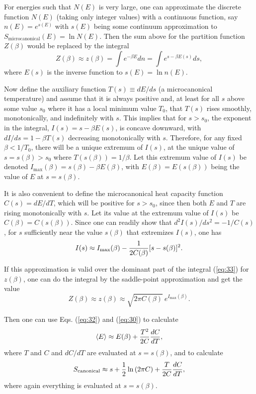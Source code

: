 \documentclass[12pt]{article} \usepackage{latexsym} \textwidth 15cm
\begin{document}
For energies such that $N(E)$ is very large, one can approximate the
discrete function $N(E)$ (taking only integer values) with a continuous
function, say $n(E) = e^{s(E)}$ with $s(E)$ being some continuum
approximation to $S_{\mathrm{microcanonical}}(E) = \ln{N(E)}$.  Then
the sum above for the partition function $Z(\beta)$ would be replaced
by the integral
 \begin{equation}
 Z(\beta) \approx z(\beta) = \int e^{-\beta E} dn
  = \int e^{s-\beta E(s)} ds,
 \label{eq:33}
 \end{equation}
where $E(s)$ is the inverse function to $s(E) = \ln{n(E)}$.

Now define the auxiliary function $T(s) \equiv dE/ds$ (a microcanonical
temperature) and assume that it is always positive and, at least for
all $s$ above some value $s_0$ where it has a local minimum value
$T_0$, that $T(s)$ rises smoothly, monotonically, and indefinitely with
$s$.  This implies that for $s > s_0$, the exponent in the integral,
$I(s) = s-\beta E(s)$, is concave downward, with $dI/ds = 1 - \beta
T(s)$ decreasing monotonically with $s$.  Therefore, for any fixed
$\beta < 1/T_0$, there will be a unique extremum of $I(s)$, at the
unique value of $s = s(\beta) > s_0$ where $T(s(\beta)) = 1/\beta$. 
Let this extremum value of $I(s)$ be denoted $I_{\mathrm{max}}(\beta) =
s(\beta) - \beta E(\beta)$, with $E(\beta) = E(s(\beta))$ being the
value of $E$ at $s = s(\beta)$.

It is also convenient to define the microcanonical heat capacity
function $C(s) = dE/dT$, which will be positive for $s > s_0$, since
then both $E$ and $T$ are rising monotonically with $s$.  Let its value
at the extremum value of $I(s)$ be $C(\beta) = C(s(\beta))$.  Since one
can readily show that $d^2I(s)/ds^2 = -1/C(s)$, for $s$ sufficiently
near the value $s(\beta)$ that extremizes $I(s)$, one has
 \begin{equation}
 I(s) \approx I_{\mathrm{max}}(\beta) - {1\over 2C(\beta)}[s-s(\beta)]^2.
 \label{eq:34}
 \end{equation}

If this approximation is valid over the dominant part of the integral
(\ref{eq:33}) for $z(\beta)$, one can do the integral by the
saddle-point approximation and get the value
 \begin{equation}
 Z(\beta) \approx z(\beta) \approx \sqrt{2\pi C(\beta)}\ 
 e^{I_{\mathrm{max}}(\beta)}.
 \label{eq:35}
 \end{equation}

Then one can use Eqs. (\ref{eq:32}) and (\ref{eq:30}) to calculate
 \begin{equation}
 \langle E \rangle \approx E(\beta) + {T^2\over 2C}{dC\over dT},
 \label{eq:36}
 \end{equation}
where $T$ and $C$ and $dC/dT$ are evaluated at $s = s(\beta)$, and to
calculate
 \begin{equation}
 S_{\mathrm{canonical}} \approx s + {1\over 2}\ln{(2\pi C)}
     + {T\over 2C}{dC\over dT},
 \label{eq:37}
 \end{equation}
where again everything is evaluated at $s = s(\beta)$.
\end{document}
